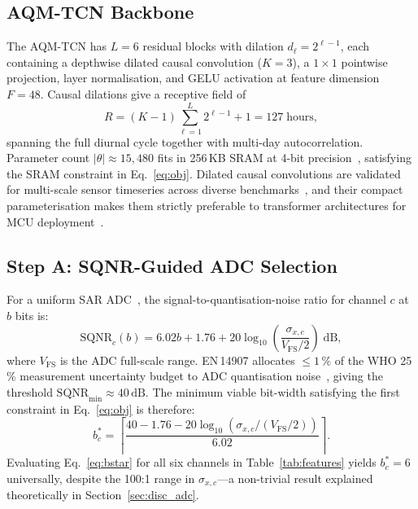 \documentclass[12pt,a4paper]{article}
\begin{document}
\subsection{AQM-TCN Backbone}
\label{sec:tcn}

The AQM-TCN has $L=6$ residual blocks with dilation $d_\ell=2^{\ell-1}$,
each containing a depthwise dilated causal convolution ($K=3$),
a $1{\times}1$ pointwise projection, layer normalisation, and GELU
activation at feature dimension $F=48$.
Causal dilations give a receptive field of
\begin{equation}
  R = (K-1)\sum_{\ell=1}^{L}2^{\ell-1}+1 = 127\;\text{hours},
  \label{eq:rf}
\end{equation}
spanning the full diurnal cycle together with multi-day autocorrelation.
Parameter count $|\theta|\approx15{,}480$ fits in 256\,KB SRAM at
4-bit precision~\cite{lin2021mcunetv2,david2021tflitemicro}, satisfying
the SRAM constraint in Eq.~\eqref{eq:obj}.
Dilated causal convolutions are validated for multi-scale sensor
timeseries across diverse benchmarks~\cite{wu2023timesnet,nie2023patchtst,liang2023tcnaq},
and their compact parameterisation makes them strictly preferable to
transformer architectures for MCU deployment~\cite{zeng2023linear}.

\subsection{Step A: SQNR-Guided ADC Selection}
\label{sec:sqnr}

For a uniform SAR ADC~\cite{murmann2023adc}, the signal-to-quantisation-noise
ratio for channel $c$ at $b$ bits is:
\begin{equation}
  \mathrm{SQNR}_c(b)
    = 6.02b + 1.76
      + 20\log_{10}\!\left(\frac{\sigma_{x,c}}{V_\mathrm{FS}/2}\right)\;\mathrm{dB},
  \label{eq:sqnr}
\end{equation}
where $V_\mathrm{FS}$ is the ADC full-scale range.
EN\,14907 allocates $\leq1\,\%$ of the WHO 25\,\% measurement
uncertainty budget to ADC quantisation noise~\cite{who2021}, giving
the threshold $\mathrm{SQNR}_\mathrm{min}\approx40\,\mathrm{dB}$.
The minimum viable bit-width satisfying the first constraint in
Eq.~\eqref{eq:obj} is therefore:
\begin{equation}
  b_c^* = \left\lceil
    \frac{40 - 1.76 - 20\log_{10}(\sigma_{x,c}/(V_\mathrm{FS}/2))}
         {6.02}
  \right\rceil.
  \label{eq:bstar}
\end{equation}
Evaluating Eq.~\eqref{eq:bstar} for all six channels in
Table~\ref{tab:features} yields $b_c^*=6$ universally, despite the
100:1 range in $\sigma_{x,c}$---a non-trivial result explained
theoretically in Section~\ref{sec:disc_adc}.
\end{document}
